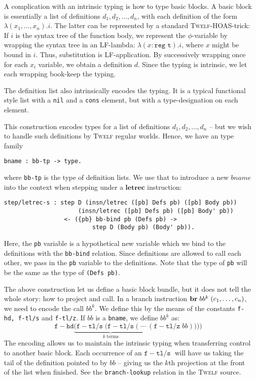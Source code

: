 \documentclass[a4paper, oneside, 10pt, draft]{memoir}
\newcommand{\twelf}{\textsc{Twelf}}
\begin{document}
A complication with an intrinsic typing is how to type basic blocks. A
basic block is essentially a list of definitions $d_1, d_2, \dotsc,
d_n$, with each definition of the form $\lambda (x_1, \dotsc,
x_n).i$. The latter can be represented by a standard \twelf{}-HOAS-trick:
If $i$ is the syntax tree of the function body, we represent the
$\phi$-variable by wrapping the syntax tree in an LF-lambda: $\lambda
(x : \texttt{reg t}) . i$, where $x$ might be bound in $i$. Thus,
substitution is LF-application. By successively wrapping once for each
$x_i$ variable, we obtain a definition $d$. Since the typing is
intrinsic, we let each wrapping book-keep the typing.

The definition list also intrinsically encodes the typing. It is a
typical functional style list with a \texttt{nil} and a \texttt{cons}
element, but with a type-designation on each element.

This construction encodes types for a list of definitions $d_1, d_2,
\dotsc, d_n$ -- but we wish to handle such definitions by \twelf{}
regular worlds. Hence, we have an type family
\begin{verbatim}
bname : bb-tp -> type.
\end{verbatim}
where \texttt{bb-tp} is the type of definition lists. We use that to
introduce a new $bname$ into the context when stepping under a
$\mathbf{letrec}$ instruction:
\begin{verbatim}
step/letrec-s : step D (insn/letrec ([pb] Defs pb) ([pb] Body pb))
                     (insn/letrec ([pb] Defs pb) ([pb] Body' pb))
                 <- ({pb} bb-bind pb (Defs pb) ->
                         step D (Body pb) (Body' pb)).
\end{verbatim}
Here, the \texttt{pb} variable is a hypothetical new variable which we
bind to the definitions with the \texttt{bb-bind} relation. Since
definitions are allowed to call each other, we pass in the \texttt{pb}
variable to the definitions. Note that the type of \texttt{pb} will be
the same as the type of \texttt{(Defs pb)}.

The above construction let us define a basic block bundle, but it does
not tell the whole story: how to project and call. In a branch
instruction $\mathbf{br} \; bb^k \; (c_1, \dotsc, c_n)$, we need to encode the
call $bb^k$. We define this by the means of the constants
\texttt{f-hd, f-tl/s} and \texttt{f-tl/z}. If $bb$ is a
\texttt{bname}, we define $bb^k$ as:
\newcommand{\fhd}{\mathtt{f\!\!-\!\!hd}}
\newcommand{\ftls}{\mathtt{f\!\!-\!\!tl/s}\; }
\newcommand{\ftlz}[1]{(\mathtt{f\!\!-\!\!tl/z} \; #1)}
\begin{equation*}
  \fhd \underbrace{(\ftls(\ftls ( \; \dotsb \; }_{k \; \text{terms}}\ftlz{bb})))
\end{equation*}
The encoding allows us to maintain the intrinsic typing when transferring
control to another basic block. Each occurrence of an $\ftls$ will
have us taking the tail of the definition pointed to by $bb$ -- giving
us the $k$th projection at the front of the list when finished. See
the \texttt{branch-lookup} relation in the \twelf{} source.
\end{document}
